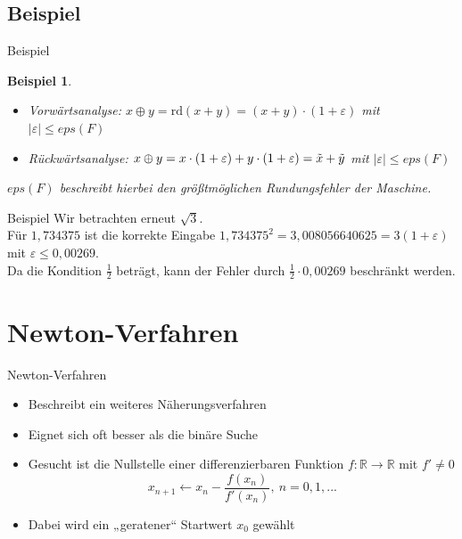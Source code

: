 \documentclass{beamer}
\newcommand{\R}{\mathbb{R}} %
\newtheorem{beispiel}[satz]{Beispiel}
\begin{document}
   \subsection{Beispiel}  
     \begin{frame}{Beispiel}
         \begin{beispiel}
           \begin{itemize}
             \item Vorwärtsanalyse: $x \oplus y = \mathrm{rd}(x+y)= (x+y) \cdot(1+ \varepsilon)$ mit $|\varepsilon| \leq eps(F)$
            \item Rückwärtsanalyse: $x\oplus y= x \cdot (1+ \varepsilon)+y\cdot (1+\varepsilon)=\Tilde{x}+ \Tilde{y}$ mit $|\varepsilon|\leq eps(F)$
         \end{itemize} 
     \vspace{\baselineskip}
    \noindent $eps(F)$ beschreibt hierbei den größtmöglichen Rundungsfehler der Maschine. 
     \end{beispiel}
     \end{frame}

     \begin{frame}{Beispiel}
         Wir betrachten erneut $\sqrt{3}$. \\
         Für $1,734375$ ist die korrekte Eingabe $1,734375^2=3,008056640625=3(1+\varepsilon)$ mit $\varepsilon \leq 0,00269$. \\ 
         Da die Kondition $\frac{1}{2}$ beträgt, kann der Fehler durch $\frac{1}{2}\cdot 0,00269$ beschränkt werden.
     \end{frame}

\section{Newton-Verfahren}
    \begin{frame}{Newton-Verfahren}
        \begin{itemize}
            \item Beschreibt ein weiteres Näherungsverfahren
            \item Eignet sich oft besser als die binäre Suche
            \item Gesucht ist die Nullstelle einer differenzierbaren Funktion $f:\R \to \R$ mit $f' \neq 0$
            \begin{equation*}
              x_{n+1} \leftarrow x_n - \frac{f(x_n)}{f'(x_n)}, \: n=0,1,...
             \end{equation*}
             \item Dabei wird ein „geratener“ Startwert $x_0$ gewählt
        \end{itemize}
    \end{frame}
    
\end{document}
